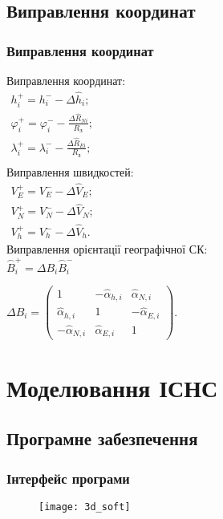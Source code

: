 \documentclass[ucs,compress]{beamer}    %
\begin{document}
\subsection{Виправлення координат} 
\begin{frame}%
\frametitle{Виправлення координат}
Виправлення координат:\\
$\begin{array}{l} 
{h^{+}_{i} =h^{-}_{i} -\Delta \hat{h}_{i} ;} \\ 
{\varphi_{i}^{+} =\varphi ^{-}_{i} -\frac{\Delta \hat{R}_{Ni} }{R_{\text{З}} } ;} \\ 
{\lambda_{i}^{+} =\lambda ^{-}_{i} -\frac{\Delta \hat{R}_{Ei} }{R_{\text{З}} } ;} \\ 
\end{array} $\\
Виправлення швидкостей:\\
$\begin{array}{l}
{V^{+}_{E}=V^{-}_{E} -\Delta \hat{V}_{E}; } \\
{V^{+}_{N}=V^{-}_{N} -\Delta \hat{V}_{N}; } \\
{V^{+}_{h}=V^{-}_{h} -\Delta \hat{V}_{h}. } 
\end{array} $\\
Виправлення орієнтації географічної СК:\\
$\stackrel{\frown}{B}^{+}_{i} =\Delta B_{i} \stackrel{\frown}{B}^{-}_{i}$

$\Delta B_{i} =\left(\begin{array}{ccc} 
{1} & {-\hat{\alpha }_{h,i} } & {\hat{\alpha }_{N,i} }\\ 
{\hat{\alpha }_{h,i} } & {1} & {-\hat{\alpha }_{E,i} }\\ 
{-\hat{\alpha }_{N,i} } & {\hat{\alpha }_{E,i} } & {1} \end{array}\right)$.                                              
%  

\end{frame}

\section{Моделювання ІСНС} 
\subsection{Програмне забезпечення} 
\begin{frame}%
\frametitle{Інтерфейс програми}
\begin{figure}
\centering
\texttt{[image: 3d\_soft]}
\end{figure}
\end{frame}
\end{document}
